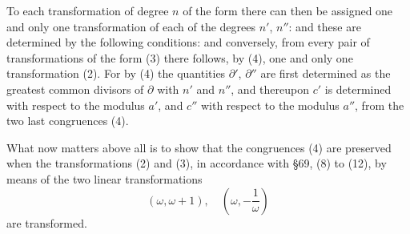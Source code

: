 To each transformation of degree $n$ of the
form
there can then be assigned one and only one transformation of each of the degrees $n'$, $n''$:
and these are determined by the following conditions:
and conversely, from every pair of transformations of the
form (3) there follows, by (4), one and only one transformation (2). For by
(4) the quantities $\partial'$, $\partial''$ are first determined as the greatest common
divisors of $\partial$ with $n'$ and $n''$, and thereupon $c'$ is determined with
respect to the modulus $a'$, and $c''$ with respect to the modulus $a''$, from the two
last congruences (4).

What now matters above all is to show that the
congruences (4) are preserved when the transformations (2)
and (3), in accordance with \S 69, (8) to (12), by means of the two linear transformations
\[
(\omega, \omega+1), \quad \left(\omega, -\frac{1}{\omega}\right)
\]
are transformed.

